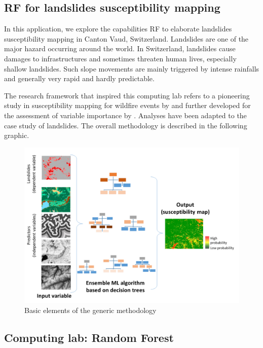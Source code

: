 \documentclass[
]{article}
\begin{document}
\subsection{RF for landslides susceptibility mapping}\label{rf-for-landslides-susceptibility-mapping}

In this application, we explore the capabilities RF to elaborate landslides susceptibility mapping in Canton Vaud, Switzerland.
Landslides are one of the major hazard occurring around the world.
In Switzerland, landslides cause damages to infrastructures and sometimes threaten human lives, especially shallow landslides.
Such slope movements are mainly triggered by intense rainfalls and generally very rapid and hardly predictable.

The research framework that inspired this computing lab refers to a pioneering study in susceptibility mapping for wildfire events by \citep{tonini_machine_2020} and further developed for the assessment of variable importance by \citep{trucchia_machine-learning_2022}.
Analyses have been adapted to the case study of landslides.
The overall methodology is described in the following graphic.

\begin{figure}

{\centering \includegraphics[width=0.8\linewidth,height=0.8\textheight]{images/Methodology} 

}

\caption{Basic elements of the generic methodology \label{Methodology}}\label{fig:gen-met}
\end{figure}

\subsection{Computing lab: Random Forest}\label{computing-lab-random-forest}
\end{document}
